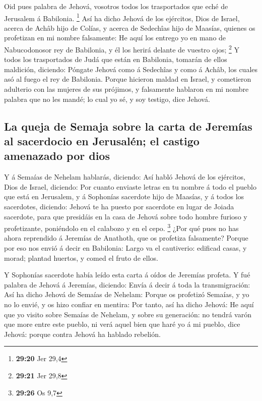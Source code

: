  Oid pues palabra de Jehová, vosotros todos los
trasportados que eché de Jerusalem á Babilonia. \footnote{\textbf{29:20}
  Jer 29,4}  Así ha dicho Jehová de los ejércitos, Dios de
Israel, acerca de Achâb hijo de Colías, y acerca de Sedechîas hijo de
Maasías, quienes os profetizan en mi nombre falsamente: He aquí los
entrego yo en mano de Nabucodonosor rey de Babilonia, y él los herirá
delante de vuestro ojos; \footnote{\textbf{29:21} Jer 29,8}
 Y todos los trasportados de Judá que están en Babilonia,
tomarán de ellos maldición, diciendo: Póngate Jehová como á Sedechîas y
como á Achâb, los cuales asó al fuego el rey de Babilonia. 
Porque hicieron maldad en Israel, y cometieron adulterio con las mujeres
de sus prójimos, y falsamente hablaron en mi nombre palabra que no les
mandé; lo cual yo sé, y soy testigo, dice Jehová.

\hypertarget{la-queja-de-semaja-sobre-la-carta-de-jeremuxedas-al-sacerdocio-en-jerusaluxe9n-el-castigo-amenazado-por-dios}{%
\subsection{La queja de Semaja sobre la carta de Jeremías al sacerdocio
en Jerusalén; el castigo amenazado por
dios}\label{la-queja-de-semaja-sobre-la-carta-de-jeremuxedas-al-sacerdocio-en-jerusaluxe9n-el-castigo-amenazado-por-dios}}

 Y á Semaías de Nehelam hablarás, diciendo: 
Así habló Jehová de los ejércitos, Dios de Israel, diciendo: Por cuanto
enviaste letras en tu nombre á todo el pueblo que está en Jerusalem, y á
Sophonías sacerdote hijo de Maasías, y á todos los sacerdotes, diciendo:
 Jehová te ha puesto por sacerdote en lugar de Joiada
sacerdote, para que presidáis en la casa de Jehová sobre todo hombre
furioso y profetizante, poniéndolo en el calabozo y en el cepo.
\footnote{\textbf{29:26} Os 9,7}  ¿Por qué pues no has
ahora reprendido á Jeremías de Anathoth, que os profetiza falsamente?
 Porque por eso nos envió á decir en Babilonia: Largo va el
cautiverio: edificad casas, y morad; plantad huertos, y comed el fruto
de ellos.

 Y Sophonías sacerdote había leído esta carta á oídos de
Jeremías profeta.  Y fué palabra de Jehová á Jeremías,
diciendo:  Envía á decir á toda la transmigración: Así ha
dicho Jehová de Semaías de Nehelam: Porque os profetizó Semaías, y yo no
lo envié, y os hizo confiar en mentira:  Por tanto, así ha
dicho Jehová: He aquí que yo visito sobre Semaías de Nehelam, y sobre su
generación: no tendrá varón que more entre este pueblo, ni verá aquel
bien que haré yo á mi pueblo, dice Jehová: porque contra Jehová ha
hablado rebelión.

